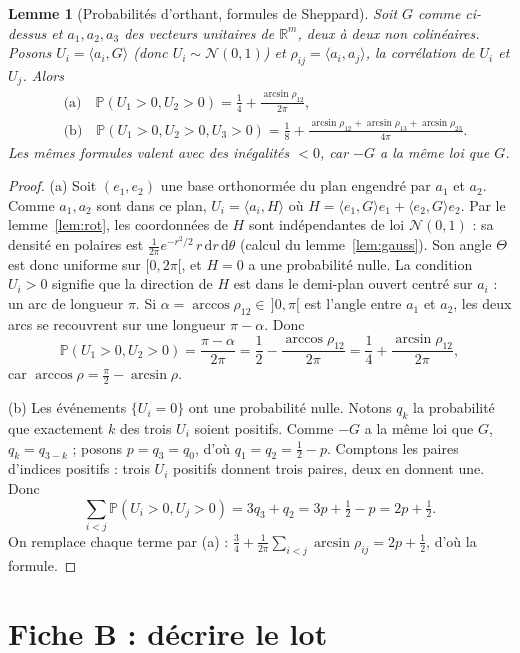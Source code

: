 \documentclass[11pt,a4paper]{article}
\theoremstyle{tq}
\newtheorem{lem}{Lemme}
\theoremstyle{remark}
\renewcommand{\P}{\mathbb{P}}
\newcommand{\R}{\mathbb{R}}
\newcommand{\N}{\mathcal{N}}
\newcommand{\dd}{\,\mathrm{d}}
\begin{document}
\begin{lem}[Probabilités d'orthant, formules de Sheppard]\label{lem:orthant}
Soit $G$ comme ci-dessus et $a_1,a_2,a_3$ des vecteurs unitaires de $\R^m$, deux à deux non colinéaires. Posons $U_i=\langle a_i,G\rangle$ (donc $U_i\sim\N(0,1)$) et $\rho_{ij}=\langle a_i,a_j\rangle$, la corrélation de $U_i$ et $U_j$. Alors
\begin{align*}
&\text{(a)}\quad \P(U_1>0,U_2>0)=\frac14+\frac{\arcsin\rho_{12}}{2\pi},\\
&\text{(b)}\quad \P(U_1>0,U_2>0,U_3>0)=\frac18+\frac{\arcsin\rho_{12}+\arcsin\rho_{13}+\arcsin\rho_{23}}{4\pi}.
\end{align*}
Les mêmes formules valent avec des inégalités $<0$, car $-G$ a la même loi que $G$.
\end{lem}
\begin{proof}
(a) Soit $(e_1,e_2)$ une base orthonormée du plan engendré par $a_1$ et $a_2$. Comme $a_1,a_2$ sont dans ce plan, $U_i=\langle a_i,H\rangle$ où $H=\langle e_1,G\rangle e_1+\langle e_2,G\rangle e_2$. Par le lemme~\ref{lem:rot}, les coordonnées de $H$ sont indépendantes de loi $\N(0,1)$ : sa densité en polaires est $\frac1{2\pi}e^{-r^2/2}\,r\dd r\dd\theta$ (calcul du lemme~\ref{lem:gauss}). Son angle $\Theta$ est donc uniforme sur $[0,2\pi[$, et $H=0$ a une probabilité nulle. La condition $U_i>0$ signifie que la direction de $H$ est dans le demi-plan ouvert centré sur $a_i$ : un arc de longueur $\pi$. Si $\alpha=\arccos\rho_{12}\in\,]0,\pi[$ est l'angle entre $a_1$ et $a_2$, les deux arcs se recouvrent sur une longueur $\pi-\alpha$. Donc
\[
\P(U_1>0,U_2>0)=\frac{\pi-\alpha}{2\pi}=\frac12-\frac{\arccos\rho_{12}}{2\pi}=\frac14+\frac{\arcsin\rho_{12}}{2\pi},
\]
car $\arccos\rho=\frac\pi2-\arcsin\rho$.

(b) Les événements $\{U_i=0\}$ ont une probabilité nulle. Notons $q_k$ la probabilité que exactement $k$ des trois $U_i$ soient positifs. Comme $-G$ a la même loi que $G$, $q_k=q_{3-k}$ ; posons $p=q_3=q_0$, d'où $q_1=q_2=\frac12-p$. Comptons les paires d'indices positifs : trois $U_i$ positifs donnent trois paires, deux en donnent une. Donc
\[
\sum_{i<j}\P(U_i>0,U_j>0)=3q_3+q_2=3p+\tfrac12-p=2p+\tfrac12 .
\]
On remplace chaque terme par (a) : $\frac34+\frac{1}{2\pi}\sum_{i<j}\arcsin\rho_{ij}=2p+\frac12$, d'où la formule.
\end{proof}

\section{Fiche B : décrire le lot}\label{sec:B}
\end{document}
